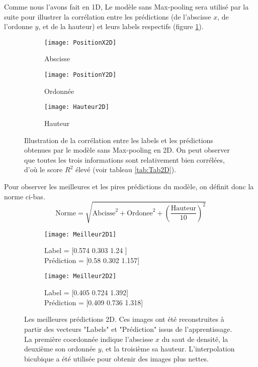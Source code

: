     Comme nous l'avons fait en 1D, Le modèle sans Max-pooling sera utilisé par la suite pour illustrer la corrélation entre les prédictions (de l'abscisse $x$, de l'ordonne $y$, et de la hauteur) et leurs labels respectifs (figure \ref{fig:Illustration2D}).
    \begin{figure}[!h]
    \begin{subfigure}{.33\textwidth}
    \centering
    \texttt{[image: PositionX2D]}  
    \caption[PosX2D]{Abscisse}
    \end{subfigure}
    \begin{subfigure}{.33\textwidth}
    \centering
    \texttt{[image: PositionY2D]}  
    \caption[PosY2D]{Ordonnée}
    \end{subfigure}
    \begin{subfigure}{.33\textwidth}
    \centering
    \texttt{[image: Hauteur2D]}  
    \caption[H2D]{Hauteur}
    \end{subfigure}
    
     \centering
    \decoRule
    \caption[Illustration 2D]{Illustration de la corrélation entre les labels et les prédictions obtenues par le modèle sans Max-pooling en 2D. On peut observer que toutes les trois informations sont relativement bien corrélées, d'où le score $R^2$ élevé (voir tableau \ref{tab:Tab2D}).}
    \label{fig:Illustration2D}
    \end{figure}
    
    Pour observer les meilleures et les pires prédictions du modèle, on définit donc la norme ci-bas. $$ \text{Norme} = \sqrt{\text{Abcisse}^2 + \text{Ordonee}^2 + \left( \frac{\text{Hauteur}}{10} \right)^2}$$
    
    \begin{figure}[!h]
    \begin{subfigure}{.5\textwidth}
    \centering
    \texttt{[image: Meilleur2D1]}  
    \caption[Meilleur2D1]{Label = [0.574 0.303 1.24 ] \\ Prédiction = [0.58  0.302 1.157]}
    \end{subfigure}
    \begin{subfigure}{.5\textwidth}
    \centering
    \texttt{[image: Meilleur2D2]}  
    \caption[Meilleur2D2]{Label = [0.405 0.724 1.392]  \\  Prédiction = [0.409 0.736 1.318]}
    \end{subfigure}
    
     \centering
    \decoRule
    \caption[Meilleur 2D]{Les meilleures prédictions 2D. Ces images ont été reconstruites à partir des vecteurs "Labels" et "Prédiction" issus de l'apprentissage. La première coordonnée indique l'abscisse $x$ du saut de densité, la deuxième son ordonnée $y$, et la troisième sa hauteur. L'interpolation bicubique a été utilisée pour obtenir des images plus nettes.}
    \label{fig:Meilleur2D}
    \end{figure}

